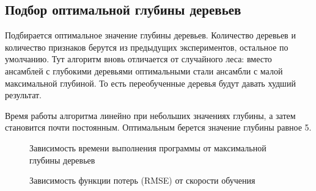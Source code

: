 \documentclass[oneside,final,12pt]{article}
\begin{document}
\subsection {Подбор оптимальной глубины деревьев}
	Подбирается оптимальное значение глубины деревьев. Количество деревьев и количество признаков берутся из предыдущих экспериментов, остальное по умолчанию. Тут алгоритм вновь отличается от случайного леса: вместо ансамблей с глубокими деревьями оптимальными стали ансамбли с малой максимальной глубиной. То есть переобученные деревья будут давать худший результат.

	Время работы алгоритма линейно при небольших значениях глубины, а затем становится почти постоянным. Оптимальным берется значение глубины равное 5.

\begin{figure}[h!]
\caption{Зависимость времени выполнения программы от максимальной глубины деревьев}
\label{fig:image6}
\end{figure}
\begin{figure}[h!]
\caption{Зависимость функции потерь (RMSE) от скорости обучения}
\label{fig:image7}
\end{figure}
\end{document}
